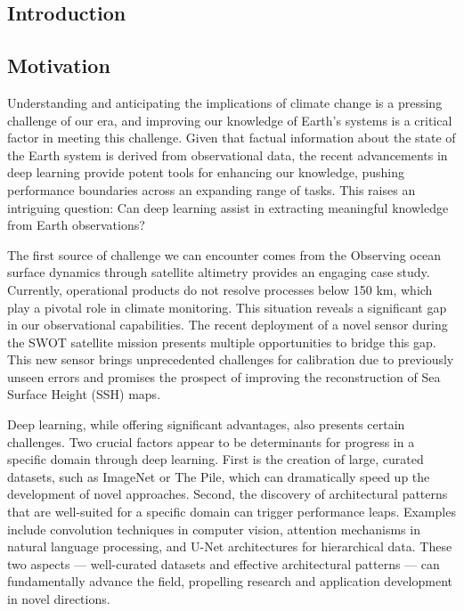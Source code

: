 \begin{bibunit}

\chapter*{Introduction}


\section*{Motivation}
Understanding and anticipating the implications of climate change is a pressing challenge of our era, and improving our knowledge of Earth's systems is a critical factor in meeting this challenge. Given that factual information about the state of the Earth system is derived from observational data, the recent advancements in deep learning provide potent tools for enhancing our knowledge, pushing performance boundaries across an expanding range of tasks. This raises an intriguing question: Can deep learning assist in extracting meaningful knowledge from Earth observations?


The first source of challenge we can encounter comes from the 
Observing ocean surface dynamics through satellite altimetry provides an engaging case study. Currently, operational products do not resolve processes below 150 km, which play a pivotal role in climate monitoring. This situation reveals a significant gap in our observational capabilities. The recent deployment of a novel sensor during the SWOT satellite mission presents multiple opportunities to bridge this gap. This new sensor brings unprecedented challenges for calibration due to previously unseen errors and promises the prospect of improving the reconstruction of Sea Surface Height (SSH) maps.


Deep learning, while offering significant advantages, also presents certain challenges. Two crucial factors appear to be determinants for progress in a specific domain through deep learning. First is the creation of large, curated datasets, such as ImageNet or The Pile, which can dramatically speed up the development of novel approaches. Second, the discovery of architectural patterns that are well-suited for a specific domain can trigger performance leaps. Examples include convolution techniques in computer vision, attention mechanisms in natural language processing, and U-Net architectures for hierarchical data. These two aspects — well-curated datasets and effective architectural patterns — can fundamentally advance the field, propelling research and application development in novel directions.


\end{bibunit}
